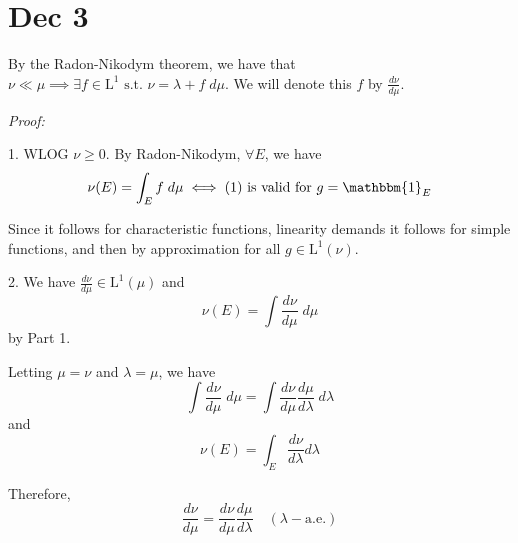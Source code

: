 \documentclass[12pt]{report}
\newcommand{\ind}{\mathbbm{1}}
\renewcommand{\L}{\text{L}}
\newcommand{\st}{\text{ s.t. }}
\newenvironment*{tbox}[2][gray]{
    \begin{tcolorbox}[
        parbox=false,
        colback=#1!5!white,
        colframe=#1!75!black,
        breakable,
        title={#2}
    ]}
    {\end{tcolorbox}}
\begin{document}
\section*{Dec 3} 
    By the Radon-Nikodym theorem, we have that $\nu \ll \mu \implies \exists f \in \L^1 \st \nu = \lambda + f\; d\mu$. We will denote this $f$ by $\frac{d\nu}{d\mu}$. 

    \begin{tbox}{\textbf{Proposition (Chain Rule):} Suppose $\nu$ is a $\sigma$-finite signed measure and $\mu, \lambda$ are $\sigma$-finite positive measures. Assume $\nu \ll \mu$ and $\mu \ll \lambda$. Then 
        \begin{enumerate}
            \item If $g \in \L^1(\nu)$, then $g \frac{d\nu}{d\mu} \in \L^1(\mu)$ and 
            \[\int g \; d\nu = \int g \frac{d\nu}{d\mu} \; d\mu\]
            \item $\nu \ll \lambda$ and 
            \[\frac{d\nu}{d\lambda} = \frac{d\nu}{d\mu}\cdot \frac{d\mu}{d\lambda} \quad (\lambda-\text{a.e.})\]
        \end{enumerate}}
        \emph{Proof:} 

        1. WLOG $\nu \geq 0$. By Radon-Nikodym, $\forall E$, we have 
        \[\nu(E) = \int_E f \; d\mu \iff \text{(1) is valid for } g = \ind_E \]

        Since it follows for characteristic functions, linearity demands it follows for simple functions, and then by approximation for all $g \in \L^1(\nu)$.

        2. We have $\frac{d\nu}{d\mu} \in \L^1(\mu)$ and 
        \[\nu(E) = \int \frac{d\nu}{d\mu}\; d\mu\]
        by Part 1. 

        Letting $\mu = \nu$ and $\lambda = \mu$, we have 
        \[\int \frac{d\nu}{d\mu}\; d\mu = \int \frac{d\nu}{d\mu} \frac{d\mu}{d\lambda} \; d\lambda\]
        and 
        \[\nu(E) = \int_E \frac{d\nu}{d\lambda} d\lambda\]

        Therefore, 
        \[\frac{d\nu}{d\mu} = \frac{d\nu}{d\mu} \frac{d\mu}{d\lambda} \quad (\lambda-\text{a.e.})\]
    \end{tbox}
\end{document}
